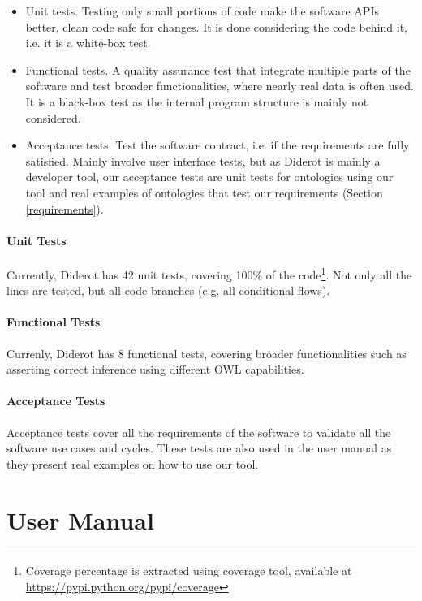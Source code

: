 \documentclass{report}
\begin{document}
\begin{itemize}
    \item Unit tests. Testing only small portions of code make the software APIs better, clean code safe for changes.
        It is done considering the code behind it, i.e. it is a white-box test.
    \item Functional tests. A quality assurance test that integrate multiple parts of the software and test broader
        functionalities, where nearly real data is often used.
        It is a black-box test as the internal program structure is mainly not considered.
    \item Acceptance tests. Test the software contract, i.e. if the requirements are fully satisfied. Mainly involve
        user interface tests, but as Diderot is mainly a developer tool, our acceptance tests are unit tests for ontologies
        using our tool and real examples of ontologies that test our requirements (Section \ref{requirements}).
\end{itemize}

\subsubsection{Unit Tests}

Currently, Diderot has 42 unit tests, covering 100\% of the code\footnote{Coverage percentage is extracted using coverage tool, available at \url{https://pypi.python.org/pypi/coverage}}.
Not only all the lines are tested, but all code branches (e.g. all conditional flows).

\subsubsection{Functional Tests}

Currenly, Diderot has 8 functional tests, covering broader functionalities such as asserting correct inference using different OWL capabilities.

\subsubsection{Acceptance Tests}

Acceptance tests cover all the requirements of the software to validate all the software use cases and cycles.
These tests are also used in the user manual \cite{manual} as they present real examples on how to use our tool.

\chapter{User Manual}
\label{manual}
\end{document}
